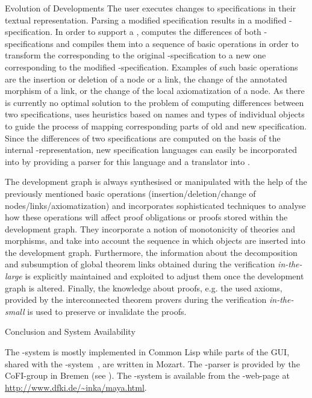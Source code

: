 \begin{omgroup}[id=maya,short=\maya,creators={autexier,hutter,mossakowski,shairer}]
\begin{omgroup}{Evolution of Developments}
The user executes changes to specifications in their textual representation.  Parsing a
modified specification results in a modified {\dgrl}-specification. In order to support a
{}, {\maya} computes the differences of both
{\dgrl}-specifications and compiles them into a sequence of basic operations in order to
transform the {} corresponding to the original
{\dgrl}-specification to a new one corresponding to the modified
{\dgrl}-specification. Examples of such basic operations are the insertion or deletion of
a node or a link, the change of the annotated morphism of a link, or the change of the
local axiomatization of a node. As there is currently no optimal solution to the problem
of computing differences between two specifications, {\maya} uses heuristics based on
names and types of individual objects to guide the process of mapping corresponding parts
of old and new specification. Since the differences of two specifications are computed on
the basis of the internal {\dgrl}-representation, new specification languages can easily
be incorporated into {\maya} by providing a parser for this language and a translator into
{\dgrl}.

The development graph is always synthesised or manipulated with the help of the
previously mentioned basic operations (insertion\slash deletion\slash change of
nodes\slash links\slash axiomatization) and {\maya} incorporates sophisticated
techniques to analyse how these operations will affect proof obligations or proofs
stored within the development graph. They incorporate a notion of monotonicity of
theories and morphisms, and take into account the sequence in which objects are
inserted into the development graph. Furthermore, the information about the
decomposition and subsumption of global theorem links obtained during the
verification {\emph{in-the-large}} is explicitly
maintained and exploited to adjust them once the development graph is altered.
Finally, the knowledge about proofs, e.g. the used axioms, provided by the
interconnected theorem provers during the verification
{\emph{in-the-small}} is used to preserve or
invalidate the proofs.
\end{omgroup}

\begin{omgroup}{Conclusion and System Availability}

The {\maya}-system is mostly implemented in Common Lisp while parts of the GUI, shared
with the {\OMEGA}-system~\cite{SieHes:loui99}, are written in Mozart. The {\casl}-parser
is provided by the CoFI-group in Bremen (see {}). The {\maya}-system is
available from the {\maya}-web-page at {\url{http://www.dfki.de/~inka/maya.html}}.


\end{omgroup}
\end{omgroup}
